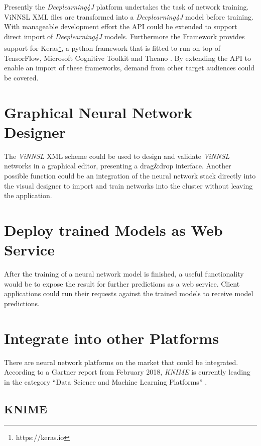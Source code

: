 Presently the \emph{Deeplearning4J} platform undertakes the task of
network training. ViNNSL XML files are transformed into a
\emph{Deeplearning4J} model before training. With manageable development
effort the API could be extended to support direct import of
\emph{Deeplearning4J} models. Furthermore the Framework provides support
for Keras\footnote{https://keras.io}, a python framework that is fitted
to run on top of TensorFlow, Microsoft Cognitive Toolkit and Theano
\cite{dl4j-keras} \cite{keras}. By extending the API to enable an import
of these frameworks, demand from other target audiences could be
covered.

\section{Graphical Neural Network
Designer}\label{graphical-neural-network-designer}

The \emph{ViNNSL} XML scheme could be used to design and validate
\emph{ViNNSL} networks in a graphical editor, presenting a drag\&drop
interface. Another possible function could be an integration of the
neural network stack directly into the visual designer to import and
train networks into the cluster without leaving the application.

\section{Deploy trained Models as Web
Service}\label{deploy-trained-models-as-web-service}

After the training of a neural network model is finished, a useful
functionality would be to expose the result for further predictions as a
web service. Client applications could run their requests against the
trained models to receive model predictions.

\section{Integrate into other
Platforms}\label{integrate-into-other-platforms}

There are neural network platforms on the market that could be
integrated. According to a Gartner report from February 2018,
\emph{KNIME} is currently leading in the category ``Data Science and
Machine Learning Platforms'' \cite{gartner}.

\subsection{KNIME}\label{knime}

